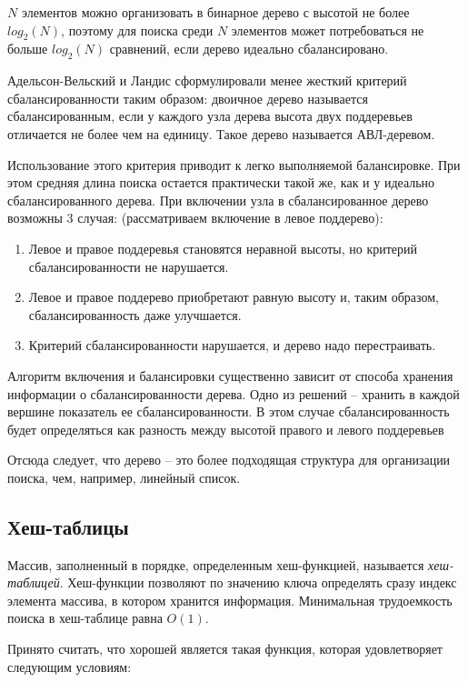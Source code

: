 $N$ элементов можно организовать в бинарное дерево с высотой не более $log_2(N)$, поэтому для поиска среди $N$ элементов может потребоваться не больше $log_2(N)$ сравнений, если дерево идеально сбалансировано. 

Адельсон-Вельский  и  Ландис  сформулировали  менее  жесткий  критерий 
сбалансированности таким образом: двоичное дерево называется сбалансированным, 
если  у  каждого  узла  дерева  высота  двух  поддеревьев  отличается  не  более  чем  на 
единицу. Такое дерево называется АВЛ-деревом.

Использование  этого  критерия  приводит  к  легко  выполняемой  балансировке. 
При  этом  средняя  длина  поиска  остается  практически  такой  же,  как  и  у  идеально 
сбалансированного дерева.  
При  включении  узла  в  сбалансированное  дерево  возможны  3  случая: 
(рассматриваем включение в левое поддерево):

\begin{enumerate}
    \item Левое  и  правое  поддеревья  становятся  неравной  высоты,  но  критерий 
    сбалансированности не нарушается.
    \item Левое  и  правое  поддерево  приобретают  равную  высоту  и,  таким  образом, 
    сбалансированность даже улучшается.
    \item Критерий сбалансированности нарушается, и дерево надо перестраивать.
\end{enumerate}

Алгоритм включения и балансировки существенно зависит от способа хранения 
информации  о  сбалансированности  дерева.  Одно  из  решений  –  хранить  в  каждой 
вершине показатель ее сбалансированности. В этом случае сбалансированность будет 
определяться как разность между высотой правого и левого поддеревьев

Отсюда следует, что дерево – это  
более подходящая структура для организации поиска, чем, например, линейный список.

\subsection{Хеш-таблицы}

Массив, заполненный в порядке, определенным хеш-функцией, называется \textit{хеш-таблицей}. Хеш-функции позволяют по значению ключа определять сразу индекс элемента массива, в котором хранится информация. Минимальная трудоемкость поиска в хеш-таблице равна $O(1)$.

Принято считать, что хорошей является такая функция, которая удовлетворяет 
следующим условиям: 

